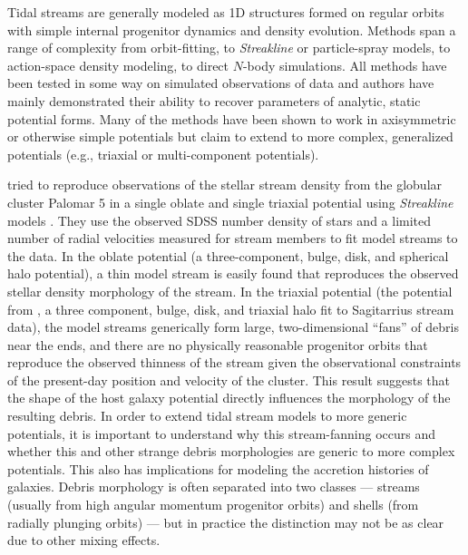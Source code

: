 \documentclass[letterpaper,12pt,preprint]{aastex}
\begin{document}
Tidal streams are generally modeled as 1D structures formed on regular orbits with simple internal progenitor dynamics and density evolution. Methods span a range of complexity from orbit-fitting, to \emph{Streakline} or particle-spray models, to action-space density modeling, to direct $N$-body simulations. All methods have been tested in some way on simulated observations of data and authors have mainly demonstrated their ability to recover parameters of analytic, static potential forms. Many of the methods have been shown to work in axisymmetric or otherwise simple potentials but claim to extend to more complex, generalized potentials (e.g., triaxial or multi-component potentials). 

\citet{pearson15} tried to reproduce observations of the stellar stream density from the globular cluster Palomar 5 in a single oblate and single triaxial potential using \emph{Streakline} models \citep{kuepper12}. They use the observed SDSS number density of stars and a limited number of radial velocities measured for stream members to fit model streams to the data. In the oblate potential (a three-component, bulge, disk, and spherical halo potential), a thin model stream is easily found that reproduces the observed stellar density morphology of the stream. In the triaxial potential (the potential from \cite{law10}, a three component, bulge, disk, and triaxial halo fit to Sagitarrius stream data), the model streams generically form large, two-dimensional ``fans'' of debris near the ends, and there are no physically reasonable progenitor orbits that reproduce the observed thinness of the stream given the observational constraints of the present-day position and velocity of the cluster. This result suggests that the shape of the host galaxy potential directly influences the morphology of the resulting debris. In order to extend tidal stream models to more generic potentials, it is important to understand why this stream-fanning occurs and whether this and other strange debris morphologies are generic to more complex potentials. This also has implications for modeling the accretion histories of galaxies. Debris morphology is often separated into two classes --- streams (usually from high angular momentum progenitor orbits) and shells (from radially plunging orbits) --- but in practice the distinction may not be as clear due to other mixing effects.
\end{document}
